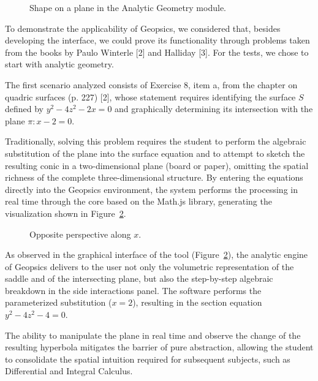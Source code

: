 \documentclass[conference,a4paper]{IEEEtran}
\begin{document}
\begin{figure}[h]
\centering
{}
\caption{Shape on a plane in the Analytic Geometry module.}
\label{fig:shape}
\end{figure}

To demonstrate the applicability of Geopsics, we considered that, besides developing the interface, we could prove its functionality through problems taken from the books by Paulo Winterle [2] and Halliday [3]. For the tests, we chose to start with analytic geometry.

The first scenario analyzed consists of Exercise 8, item a, from the chapter on quadric surfaces (p. 227) [2], whose statement requires identifying the surface $S$ defined by $y^2 - 4z^2 - 2x = 0$ and graphically determining its intersection with the plane $\pi: x - 2 = 0$.

Traditionally, solving this problem requires the student to perform the algebraic substitution of the plane into the surface equation and to attempt to sketch the resulting conic in a two-dimensional plane (board or paper), omitting the spatial richness of the complete three-dimensional structure. By entering the equations directly into the Geopsics environment, the system performs the processing in real time through the core based on the Math.js library, generating the visualization shown in Figure~\ref{fig:opp}.

\begin{figure}[h]
\centering
{}
\caption{Opposite perspective along $x$.}
\label{fig:opp}
\end{figure}

As observed in the graphical interface of the tool (Figure~\ref{fig:opp}), the analytic engine of Geopsics delivers to the user not only the volumetric representation of the saddle and of the intersecting plane, but also the step-by-step algebraic breakdown in the side interactions panel. The software performs the parameterized substitution ($x = 2$), resulting in the section equation $y^2 - 4z^2 - 4 = 0$.

The ability to manipulate the plane in real time and observe the change of the resulting hyperbola mitigates the barrier of pure abstraction, allowing the student to consolidate the spatial intuition required for subsequent subjects, such as Differential and Integral Calculus.
\end{document}
